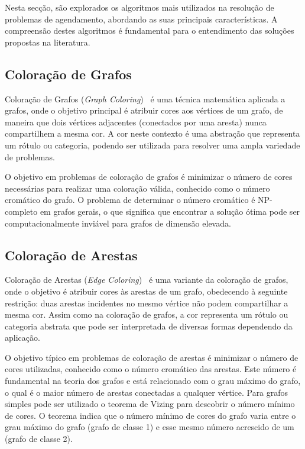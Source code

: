 Nesta secção, são explorados os algoritmos mais utilizados na resolução de problemas de agendamento, abordando as suas principais características. A compreensão destes algoritmos é fundamental para o entendimento das soluções propostas na literatura.

\subsection{Coloração de Grafos}
\label{explic:graph-coloring}

Coloração de Grafos (\textit{Graph Coloring})~\cite{GuideGraphColouring-Lewis-2016} é uma técnica matemática aplicada a grafos, onde o objetivo principal é atribuir cores aos vértices de um grafo, de maneira que dois vértices adjacentes (conectados por uma aresta) nunca compartilhem a mesma cor. A cor neste contexto é uma abstração que representa um rótulo ou categoria, podendo ser utilizada para resolver uma ampla variedade de problemas.

O objetivo em problemas de coloração de grafos é minimizar o número de cores necessárias para realizar uma coloração válida, conhecido como o número cromático do grafo. O problema de determinar o número cromático é NP-completo em grafos gerais, o que significa que encontrar a solução ótima pode ser computacionalmente inviável para grafos de dimensão elevada.

\subsection{Coloração de Arestas}
\label{explic:edge-coloring}

Coloração de Arestas (\textit{Edge Coloring})~\cite{GuideGraphColouring-Lewis-2016} é uma variante da coloração de grafos, onde o objetivo é atribuir cores às arestas de um grafo, obedecendo à seguinte restrição: duas arestas incidentes no mesmo vértice não podem compartilhar a mesma cor. Assim como na coloração de grafos, a cor representa um rótulo ou categoria abstrata que pode ser interpretada de diversas formas dependendo da aplicação.

O objetivo típico em problemas de coloração de arestas é minimizar o número de cores utilizadas, conhecido como o número cromático das arestas. Este número é fundamental na teoria dos grafos e está relacionado com o grau máximo do grafo, o qual é o maior número de arestas conectadas a qualquer vértice. Para grafos simples pode ser utilizado o teorema de Vizing para descobrir o número mínimo de cores. O teorema indica que o número mínimo de cores do grafo varia entre o grau máximo do grafo (grafo de classe 1) e esse mesmo número acrescido de um (grafo de classe 2).

